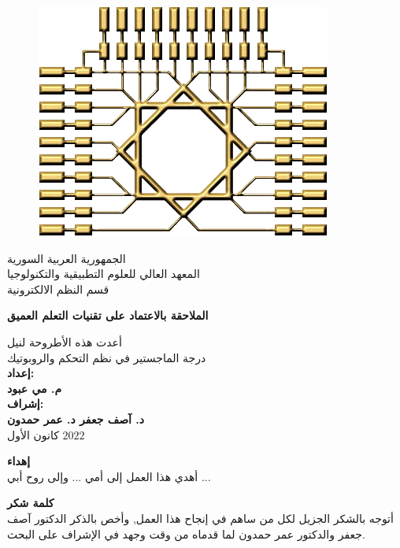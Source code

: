 
\doublespacing

\begin{titlepage}
	
	\begin{figure}[H]
		\centerline
		{\includegraphics[width=0.2\linewidth]{images/HIAST_logo.png}}
		\label{}
	\end{figure}
	\begin{center}
		
		\large
		الجمهورية العربية السورية\\
		المعهد العالي للعلوم التطبيقية والتكنولوجيا\\
		قسم النظم الالكترونية
		\Large
		\vspace{3em}
		\vspace{3pt}
		\vspace{7pt}
		
		\textbf{
			الملاحقة بالاعتماد على تقنيات التعلم العميق\\
		}
		\vspace{7pt}
		\vspace{3pt}
		
		
		\Large
		\vspace{1em}
		أعدت هذه الأطروحة لنيل\\
		درجة الماجستير في نظم  التحكم والروبوتيك\\
		
		
		\vspace{2em}
		\textbf{
			إعداد:\\
			م. مي عبود \\
			\vspace{2em}
			إشراف:\\
			د. آصف جعفر
			\hspace{4em}
			د. عمر حمدون\\
		}
		\vspace{4em}
		كانون الأول $ 2022 $
	\end{center}
	\begin{center}
		\textbf{إهداء}\\
		أهدي هذا العمل إلى أمي ...
		\newline
		وإلى روح أبي ...
		
	\end{center}
\end{titlepage}
\newpage

\newpage
\begin{center}
	\textbf{كلمة شكر}\\
أتوجه بالشكر الجزيل لكل من ساهم في إنجاح هذا العمل, وأخص بالذكر الدكتور آصف جعفر والدكتور عمر حمدون لما قدماه من وقت وجهد في الإشراف على البحث. 
\end{center}


